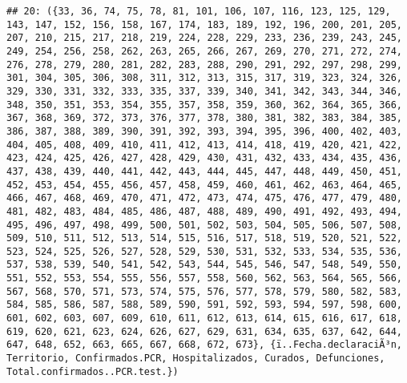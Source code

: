 \documentclass[
]{book}
\begin{document}
\begin{verbatim}
## 20: ({33, 36, 74, 75, 78, 81, 101, 106, 107, 116, 123, 125, 129, 143, 147, 152, 156, 158, 167, 174, 183, 189, 192, 196, 200, 201, 205, 207, 210, 215, 217, 218, 219, 224, 228, 229, 233, 236, 239, 243, 245, 249, 254, 256, 258, 262, 263, 265, 266, 267, 269, 270, 271, 272, 274, 276, 278, 279, 280, 281, 282, 283, 288, 290, 291, 292, 297, 298, 299, 301, 304, 305, 306, 308, 311, 312, 313, 315, 317, 319, 323, 324, 326, 329, 330, 331, 332, 333, 335, 337, 339, 340, 341, 342, 343, 344, 346, 348, 350, 351, 353, 354, 355, 357, 358, 359, 360, 362, 364, 365, 366, 367, 368, 369, 372, 373, 376, 377, 378, 380, 381, 382, 383, 384, 385, 386, 387, 388, 389, 390, 391, 392, 393, 394, 395, 396, 400, 402, 403, 404, 405, 408, 409, 410, 411, 412, 413, 414, 418, 419, 420, 421, 422, 423, 424, 425, 426, 427, 428, 429, 430, 431, 432, 433, 434, 435, 436, 437, 438, 439, 440, 441, 442, 443, 444, 445, 447, 448, 449, 450, 451, 452, 453, 454, 455, 456, 457, 458, 459, 460, 461, 462, 463, 464, 465, 466, 467, 468, 469, 470, 471, 472, 473, 474, 475, 476, 477, 479, 480, 481, 482, 483, 484, 485, 486, 487, 488, 489, 490, 491, 492, 493, 494, 495, 496, 497, 498, 499, 500, 501, 502, 503, 504, 505, 506, 507, 508, 509, 510, 511, 512, 513, 514, 515, 516, 517, 518, 519, 520, 521, 522, 523, 524, 525, 526, 527, 528, 529, 530, 531, 532, 533, 534, 535, 536, 537, 538, 539, 540, 541, 542, 543, 544, 545, 546, 547, 548, 549, 550, 551, 552, 553, 554, 555, 556, 557, 558, 560, 562, 563, 564, 565, 566, 567, 568, 570, 571, 573, 574, 575, 576, 577, 578, 579, 580, 582, 583, 584, 585, 586, 587, 588, 589, 590, 591, 592, 593, 594, 597, 598, 600, 601, 602, 603, 607, 609, 610, 611, 612, 613, 614, 615, 616, 617, 618, 619, 620, 621, 623, 624, 626, 627, 629, 631, 634, 635, 637, 642, 644, 647, 648, 652, 663, 665, 667, 668, 672, 673}, {ï..Fecha.declaraciÃ³n, Territorio, Confirmados.PCR, Hospitalizados, Curados, Defunciones, Total.confirmados..PCR.test.})

\end{verbatim}
\end{document}
